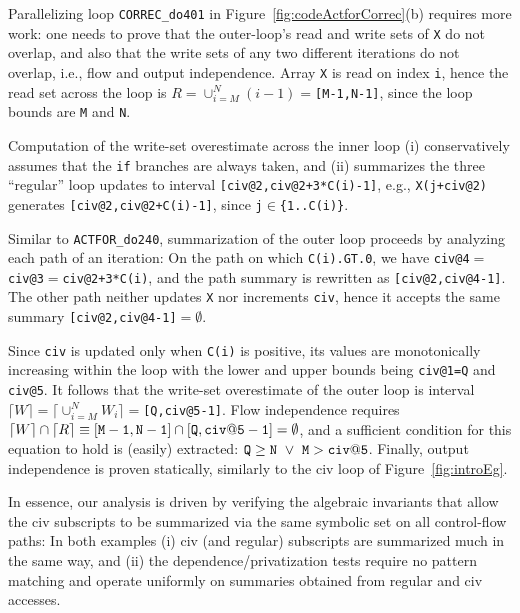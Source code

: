 \documentclass{sig-alternate}
\begin{document}

\vspace{1ex}
Parallelizing loop {\tt CORREC\_do401} in Figure~\ref{fig:codeActforCorrec}(b) 
requires more work: one needs to prove that the outer-loop's read and write 
sets of {\tt X} do not overlap, and also that the write sets of any two 
different iterations do not overlap, i.e., flow and output independence. 
Array {\tt X} is read on index {\tt i}, hence the read set across the loop 
is {\tt$R=\cup_{i=M}^{N}(i-1)=$[M-1,N-1]}, 
since the loop bounds are {\tt M} and {\tt N}.


Computation of the write-set overestimate across the inner loop 
(i)  conservatively assumes that the {\tt if} branches are always taken, and
(ii) summarizes the three ``regular'' loop updates 
to interval {\tt[civ@2,civ@2+3*C(i)-1]},
e.g., {\tt X(j+civ@2)} generates {\tt[civ@2,civ@2+C(i)-1]}, since  
{\tt j$\in$\{1..C(i)\}}.

Similar to {\tt ACTFOR\_do240}, summarization of the outer loop
proceeds by analyzing each path of an iteration:
On the path on which {\tt C(i).GT.0}, we have %
{\tt civ@4$=$civ@3$=$civ@2+3*C(i)}, and the path summary is
rewritten as {\tt [civ@2,civ@4-1]}. The other path neither 
updates {\tt X} nor increments {\tt civ}, hence it accepts the
same summary {\tt[civ@2,civ@4-1]$=\emptyset$}.

Since {\tt civ} is updated only when {\tt C(i)} is positive,
its values are monotonically increasing within the loop with
the lower and upper bounds being {\tt civ@1=Q} and {\tt civ@5}. 
It follows that the write-set overestimate of the outer loop is 
interval $\lceil W \rceil = \lceil \cup_{i=M}^{N}W_i\rceil =${\tt[Q,civ@5-1]}.
Flow independence requires   
$\lceil W\rceil\cap\lceil R \rceil \equiv {\tt [M-1,N-1]}\cap{\tt{}[Q,civ@5-1]}=\emptyset$,
and a sufficient condition for this equation to hold is (easily) extracted:
${\tt Q} \ge {\tt N}~\vee~{\tt M} > {\tt{}civ@5}$.
%
Finally, output independence is proven statically, similarly to the 
{\sc civ} loop of Figure~\ref{fig:introEg}.

\vspace{1ex}

In essence, our analysis is driven by verifying the algebraic 
invariants that allow the {\sc civ} subscripts to be summarized 
via the same symbolic set on all control-flow paths:
%
In both examples (i) {\sc civ} (and regular) subscripts are 
summarized much in the same way, and (ii) the dependence/privatization 
tests require no pattern matching and operate uniformly on summaries
obtained from regular and {\sc civ} accesses.
% 
\end{document}
